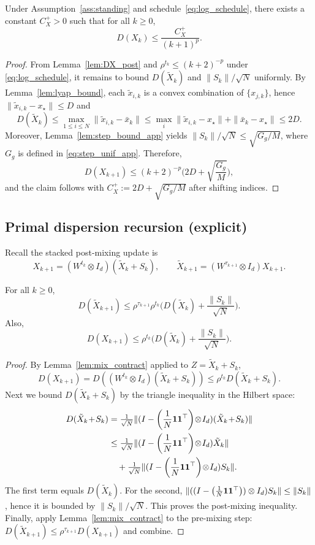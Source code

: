 \documentclass[review,onefignum,onetabnum]{siamart171218}
\begin{document}
\begin{lemma}\label{lem:DX_post_decay}
Under Assumption~\ref{ass:standing} and schedule~\eqref{eq:log_schedule}, there exists a constant $C_X^{+}>0$ such that for all $k\ge 0$,
\[
D(X_k)\le \frac{C_X^{+}}{(k+1)^{p}}.
\]
\end{lemma}
\begin{proof}
From Lemma~\ref{lem:DX_post} and $\rho^{t_k}\le (k+2)^{-p}$ under \eqref{eq:log_schedule}, it remains to bound
$D(\tilde X_k)$ and $\|S_k\|/\sqrt N$ uniformly.
By Lemma~\ref{lem:lyap_bound}, each $\tilde x_{i,k}$ is a convex combination of $\{x_{j,k}\}$, hence $\|\tilde x_{i,k}-x_\star\|\le D$ and
\[
D(\tilde X_k)\le \max_{1\le i\le N}\|\tilde x_{i,k}-\bar x_k\|
\le \max_i \|\tilde x_{i,k}-x_\star\|+\|\bar x_k-x_\star\|\le 2D.
\]
Moreover, Lemma~\ref{lem:step_bound_app} yields $\|S_k\|/\sqrt N\le \sqrt{G_g/M}$, where $G_g$ is defined in \eqref{eq:step_unif_app}.
Therefore,
\[
D(X_{k+1})\le (k+2)^{-p}\Big(2D+\sqrt{\frac{G_g}{M}}\Big),
\]
and the claim follows with $C_X^{+}:=2D+\sqrt{G_g/M}$ after shifting indices.
\end{proof}

\subsection{Primal dispersion recursion (explicit)}

Recall the stacked post-mixing update is
\[
X_{k+1}=(W^{t_k}\otimes I_d)(\tilde X_k+S_k),
\qquad
\tilde X_{k+1}=(W^{\tau_{k+1}}\otimes I_d)X_{k+1}.
\]
\begin{lemma}\label{lem:DX_rec}
For all $k\ge0$,
\[
D(\tilde X_{k+1})
\le \rho^{\tau_{k+1}}\rho^{t_k}\Big(D(\tilde X_k)+\frac{\|S_k\|}{\sqrt N}\Big).
\]
Also,
\[
D(X_{k+1})
\le \rho^{t_k}\Big(D(\tilde X_k)+\frac{\|S_k\|}{\sqrt N}\Big).
\]
\end{lemma}
\begin{proof}
By Lemma~\ref{lem:mix_contract} applied to $Z=\tilde X_k+S_k$,
\[
D(X_{k+1})=D((W^{t_k}\otimes I_d)(\tilde X_k+S_k))\le \rho^{t_k}D(\tilde X_k+S_k).
\]
Next we bound $D(\tilde X_k+S_k)$ by the triangle inequality in the Hilbert space:
\begin{align*}
D(\tilde X_k\!+\!S_k)
&=\tfrac1{\sqrt N}\|(\Pmat\!\otimes\! I_d)(\tilde X_k\!+\!S_k)\|\\
&\le \tfrac1{\sqrt N}\|(\Pmat\!\otimes\! I_d)\tilde X_k\|\\
&\quad+\tfrac1{\sqrt N}\|(\Pmat\!\otimes\! I_d)S_k\|.
\end{align*}
The first term equals $D(\tilde X_k)$.
For the second, $\|((I-\left(\frac{1}{N}\mathbf{1}\mathbf{1}^\top\right))\otimes I_d)S_k\|\le \|S_k\|$, hence it is bounded by $\|S_k\|/\sqrt N$.
This proves the post-mixing inequality.
Finally, apply Lemma~\ref{lem:mix_contract} to the pre-mixing step:
$D(\tilde X_{k+1})\le \rho^{\tau_{k+1}}D(X_{k+1})$ and combine.
\end{proof}
\end{document}
